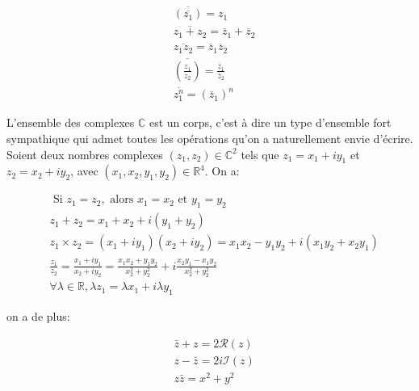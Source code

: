 \begin{align} 
    & \overline{\left(\overline{z_1}\right)}=z_{1} \\ 
    & \overline{z_1+z_2}=\overline{z}_{1}+\overline{z}_{2} \\ 
    & \overline{z_1 z_2}=\overline{z}_{1} \overline{z}_{2} \\ 
    & \overline{\left(\frac{z_1}{z_2}\right)}=\frac{\overline{z}_{1}}{\overline{z}_{2}} \\ & \overline{z_1^n}=\left(\overline{z}_{1}\right)^{n}
\end{align}


\begin{figure}[H]
    \centering
\end{figure}

L'ensemble des complexes $\mathbb{C}$ est un corps, c'est à dire un type d'ensemble fort sympathique qui admet toutes les opérations qu'on a naturellement envie d'écrire. Soient deux nombres complexes $\left(z_1, z_2\right) \in \mathbb{C}^2$ tels que $z_1=x_1+i y_1$ et $z_2=x_2+i y_2$, avec $\left(x_1, x_2, y_1, y_2\right) \in \mathbb{R}^4$. On a:

\begin{align}
& \text { Si } z_1=z_2, \text { alors } x_{1}=x_{2} \text { et } y_{1}=y_{2} \\
& z_1+z_2=x_{1}+x_{2}+i\left(y_{1}+y_{2}\right) \\
& z_1 \times z_2=\left(x_{1}+i y_{1}\right)\left(x_{2}+i y_{2}\right)=x_{1} x_{2}-y_{1} y_{2}+i\left(x_{1} y_{2}+x_{2} y_{1}\right) \\
& \frac{z_1}{z_2}=\frac{x_{1}+i y_{1}}{x_{2}+i y_{2}}=\frac{x_{1} x_{2}+y_{1} y_{2}}{x_{2}^{2}+y_{2}^{2}}+i \frac{x_{2} y_{1}-x_{1} y_{2}}{x_{2}^{2}+y_{2}^{2}} \\
& \forall \lambda \in \mathbb{R}, \lambda z_1=\lambda x_{1}+i \lambda y_{1}
\end{align}

on a de plus:

\begin{align}
& \bar{z}+z=2 \mathcal{R}(z) \\
& z-\bar{z}=2 i \mathcal{I}(z) \\
& z \bar{z}=x^2+y^2
\end{align}

